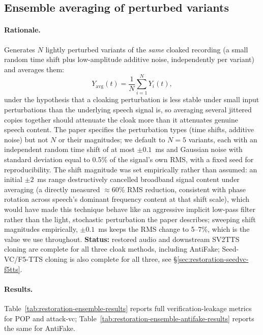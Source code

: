 \documentclass[11pt]{article}
\begin{document}
\subsection{Ensemble averaging of perturbed variants}
\label{sec:restoration-ensemble}

\paragraph{Rationale.} Generates $N$ lightly perturbed variants of the
\emph{same} cloaked recording (a small random time shift plus
low-amplitude additive noise, independently per variant) and averages
them:
\[
Y_{\mathrm{avg}}(t) = \frac{1}{N}\sum_{i=1}^{N} Y_i(t),
\]
under the hypothesis that a cloaking perturbation is less stable under
small input perturbations than the underlying speech signal is, so
averaging several jittered copies together should attenuate the cloak
more than it attenuates genuine speech content. The paper specifies
the perturbation types (time shifts, additive noise) but not $N$ or
their magnitudes; we default to $N=5$ variants, each with an
independent random time shift of at most $\pm0.1$~ms and Gaussian noise
with standard deviation equal to 0.5\% of the signal's own RMS, with a
fixed seed for reproducibility. The shift magnitude was set empirically
rather than assumed: an initial $\pm2$~ms range destructively cancelled
broadband signal content under averaging (a directly measured
$\approx$60\% RMS reduction, consistent with phase rotation across
speech's dominant frequency content at that shift scale), which would
have made this technique behave like an aggressive implicit low-pass
filter rather than the light, stochastic perturbation the paper
describes; sweeping shift magnitudes empirically, $\pm0.1$~ms keeps the
RMS change to 5--7\%, which is the value we use throughout.
\textbf{Status:} restored audio and downstream SV2TTS cloning are
complete for all three cloak methods, including AntiFake; Seed-VC/F5-TTS
cloning is also complete for all three, see
\S\ref{sec:restoration-seedvc-f5tts}.

\paragraph{Results.} Table~\ref{tab:restoration-ensemble-results}
reports full verification-leakage metrics for POP and attack-vc;
Table~\ref{tab:restoration-ensemble-antifake-results} reports the same
for AntiFake.
\end{document}
